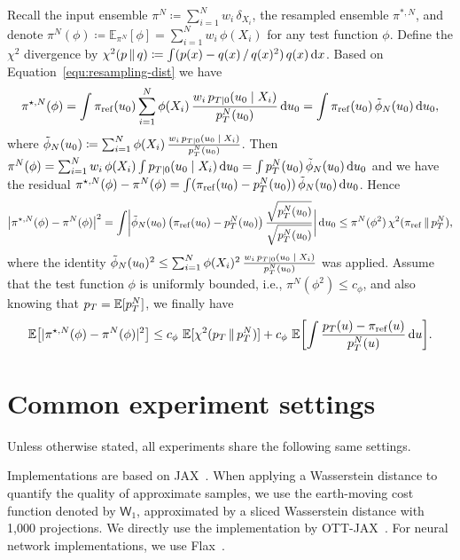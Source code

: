 \documentclass{article}
\begin{document}
Recall the input ensemble $\pi^N \coloneqq \sum_{i=1}^N w_i \, \delta_{X_i}$, the resampled ensemble $\pi^{*, N}$, and denote $\pi^N(\phi) \coloneqq \mathbb{E}_{\pi^N}[\phi] = \sum_{i=1}^N w_i \, \phi(X_i)$ for any test function $\phi$. 
Define the $\chi^2$ divergence by $\chi^2(p \, \Vert \, q) \coloneqq \int (p(x)-q(x) \, / \, q(x)^2) \, q(x) \mathop{}\!\mathrm{d} x$. 
Based on Equation~\eqref{equ:resampling-dist} we have 
%
\begin{equation}
    \pi^{\star,N}(\phi)=\int\pi_{\mathrm{ref}}(u_0)\sum_{i=1}^N\phi(X_i) \, \frac{w_i \, p_{T|0}(u_0 {\;|\;} X_i)}{p_T^N(u_0)} \mathop{}\!\mathrm{d} u_0=\int\pi_{\mathrm{ref}}(u_0) \, \tilde{\phi}_N(u_0) \mathop{}\!\mathrm{d} u_0,
\end{equation}
%
where $\tilde{\phi}_N(u_0)\coloneqq\sum_{i=1}^N\phi(X_i) \, \frac{w_i \, p_{T|0}(u_0 {\;|\;} X_i)}{p_T^N(u_0)}$. 
Then $\pi^N(\phi)=\sum_{i=1}^N w_i \, \phi(X_i)\int p_{T|0}(u_0 {\;|\;} X_i) \mathop{}\!\mathrm{d} u_0=\int p_T^N(u_0) \, \tilde{\phi}_N(u_0) \mathop{}\!\mathrm{d} u_0$ and we have the residual $\pi^{\star,N}(\phi)-\pi^N(\phi)=\int(\pi_{\mathrm{ref}}(u_0)-p_T^N(u_0)) \, \tilde{\phi}_N(u_0) \mathop{}\!\mathrm{d} u_0$. 
Hence
%
\begin{equation}
    \bigl \lvert \pi^{\star,N}(\phi)-\pi^N(\phi) \bigr\rvert^2=\int \biggl \lvert \tilde{\phi}_N(u_0) \, \bigl(\pi_{\mathrm{ref}}(u_0)-p_T^N(u_0) \bigr) \, \frac{\sqrt{p_T^N(u_0)}}{\sqrt{p_T^N(u_0)}} \biggr\rvert\mathop{}\!\mathrm{d} u_0\leq\pi^N(\phi^2) \, \chi^2(\pi_{\mathrm{ref}} \, \Vert \, p_T^N),
\end{equation}
%
where the identity $\tilde{\phi}_N(u_0)^2\leq\sum_{i=1}^N\phi(X_i)^2 \, \frac{w_i \, p_{T|0}(u_0 {\;|\;} X_i)}{p_T^N(u_0)}$ was applied.
Assume that the test function $\phi$ is uniformly bounded, i.e., $\pi^N(\phi^2) \leq c_\phi$, and also knowing that $p_T = \expec{p_T^N}$, we finally have
%
\begin{equation}
    \expecbig{\abs{\pi^{\star,N}(\phi)-\pi^N(\phi)}^2}\leq c_\phi \, \expec{\chi^2(p_T \, \Vert \, p_T^N)}+c_\phi \, \expecbigg{\int\frac{p_T(u)-\pi_{\mathrm{ref}}(u)}{p_T^N(u)} \diff u}.
\end{equation}
%

\section{Common experiment settings}
Unless otherwise stated, all experiments share the following same settings. 

Implementations are based on JAX~\citep{Jax2018github}. 
When applying a Wasserstein distance to quantify the quality of approximate samples, we use the earth-moving cost function denoted by $\mathsf{W}_1$, approximated by a sliced Wasserstein distance with 1,000 projections. 
We directly use the implementation by OTT-JAX~\citep{Cuturi2022OTT}. 
For neural network implementations, we use Flax~\citep{Flax2020github}. 
\end{document}
